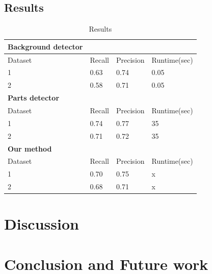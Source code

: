 \documentclass[10pt,twocolumn,letterpaper]{article}
\begin{document}
\subsection{Results} 
\begin{table}[ht]
  \begin{tabular}{llll}
    \hline
    \textbf{Background detector}\\  
    \hline
    Dataset & Recall & Precision & Runtime(sec)\\
    \hline
 	1 & 0.63 & 0.74 & 0.05\\
 	2 & 0.58 &0.71 & 0.05 \\
   \hline
   \textbf{Parts detector}\\
   \hline
   Dataset & Recall & Precision & Runtime(sec)\\
    \hline
 	1 & 0.74 & 0.77 & 35\\
 	2 & 0.71 & 0.72 & 35 \\
   \hline   
   \textbf{Our method}\\
   \hline
   Dataset & Recall & Precision & Runtime(sec)\\
   \hline   
 	1 & 0.70 & 0.75 & x\\
 	2 & 0.68 & 0.71 & x\\
   \hline   
  \end{tabular}
  \caption{Results}
  \label{tab:Results}
\end{table}

\section{Discussion}
\section{Conclusion and Future work}
{\small


}
\end{document}
